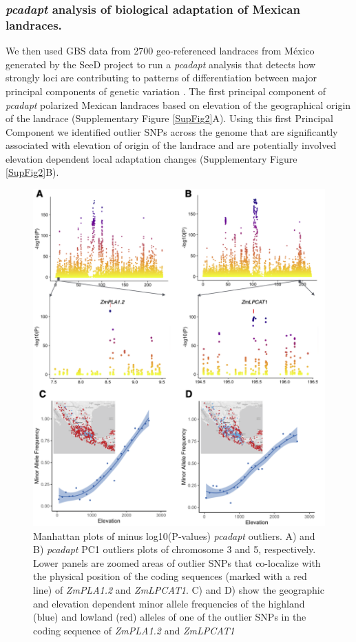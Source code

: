 \documentclass[9pt,twocolumn,twoside,lineno]{BioRxiv}
\begin{document}
\subsubsection{\textit{pcadapt} analysis of biological adaptation of Mexican landraces.} 
We then used GBS data from 2700 geo-referenced landraces from México generated by the SeeD project \cite{Romero_Navarro2017-cn, Gates2019-xu} to run a \textit{pcadapt} analysis that detects how strongly loci are contributing to patterns of differentiation between major principal components of genetic variation \cite{Luu2017-ws}.
The first principal component of \textit{pcadapt} polarized Mexican landraces based on elevation of the geographical origin of the landrace (Supplementary Figure \ref{SupFig2}A).
Using this first Principal Component we identified outlier SNPs across the genome that are significantly associated with elevation of origin of the landrace and are potentially involved elevation dependent local adaptation changes (Supplementary Figure \ref{SupFig2}B). 
\begin{figure}[h]
\begin{center}
\includegraphics[width=0.4\paperwidth]{Figures/Fig_2.png}
\caption{Manhattan plots of minus log10(P‐values) \textit{pcadapt} outliers. A) and B) \textit{pcadapt} PC1 outliers plots of chromosome 3 and 5, respectively. 
Lower panels are zoomed areas of outlier SNPs that co-localize with the physical position of the coding sequences (marked with a red line) of \textit{ZmPLA1.2} and \textit{ZmLPCAT1}. C) and D) show the geographic and elevation dependent minor allele frequencies of the highland (blue) and lowland (red) alleles of one of the outlier SNPs in the coding sequence of \textit{ZmPLA1.2} and \textit{ZmLPCAT1}}
\label{Fig2}
\end{center}
\end{figure} 
\end{document}
